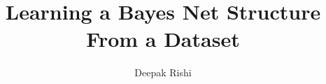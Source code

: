 \documentclass[]{report}
\title{Learning a Bayes Net Structure From a Dataset}
\author{Deepak Rishi}
\begin{document}
\maketitle

\begin{abstract}
\end{abstract}
\end{document}
